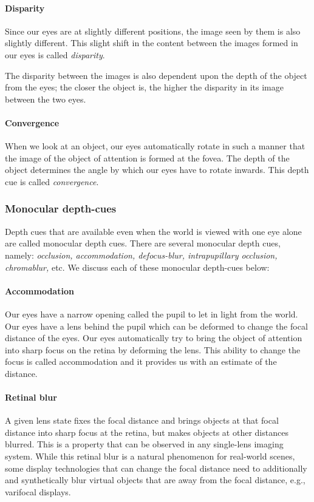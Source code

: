 \paragraph{Disparity} Since our eyes are at slightly different positions, the image seen by them is also slightly different. 
This slight shift in the content between the images formed in our eyes is called \emph{disparity}. 



The disparity between the images is also dependent upon the depth of the object from the eyes; the closer the object is, the higher the disparity in its image between the two eyes. 

\paragraph{Convergence} When we look at an object, our eyes automatically rotate in such a manner that the image of the object of attention is formed at the fovea. 
The depth of the object determines the angle by which our eyes have to rotate inwards. This depth cue is called \emph{convergence}.

\subsubsection{Monocular depth-cues}
\label{sec:background:monocular}
Depth cues that are available even when the world is viewed with one eye alone are called monocular depth cues. 
There are several monocular depth cues, namely: \emph{occlusion, accommodation, defocus-blur, intrapupillary occlusion, chromablur,} etc. 
We discuss each of these monocular depth-cues below: 

\paragraph{Accommodation} Our eyes have a narrow opening called the pupil to let in light from the world. 
Our eyes have a lens behind the pupil which can be deformed to change the focal distance of the eyes. 
Our eyes automatically try to bring the object of attention into sharp focus on the retina by deforming the lens. 
This ability to change the focus is called accommodation and it provides us with an estimate of the distance. 

\paragraph{Retinal blur} A given lens state fixes the focal distance and brings objects at that focal distance into sharp focus at the retina, but makes objects at other distances blurred. 
This is a property that can be observed in any single-lens imaging system. 
While this retinal blur is a natural phenomenon for real-world scenes, some display technologies that can change the focal distance need to additionally and synthetically blur virtual objects that are away from the focal distance, e.g., varifocal displays. 
